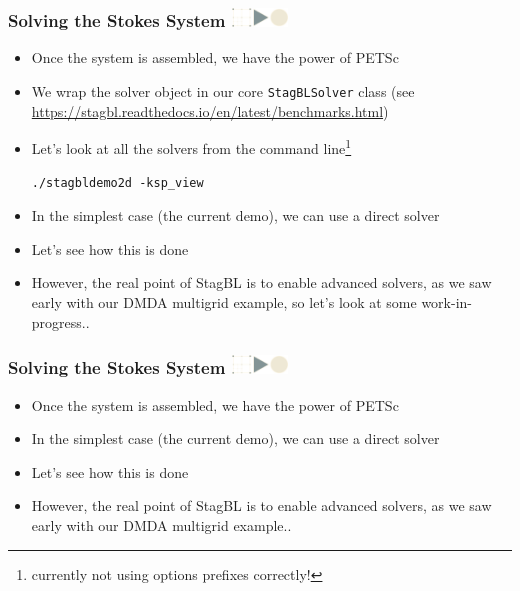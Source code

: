 \documentclass{beamer}
\newcommand\frametitlelogo[1]{\frametitle{#1\hspace{0pt plus 1 filll} \includegraphics[width=42pt]{logo_slides}}}
\begin{document}
\begin{frame}[fragile]
\frametitlelogo{Solving the Stokes System}
\begin{itemize}
\item Once the system is assembled, we have the power of PETSc
\item We wrap the solver object in our core \lstinline{StagBLSolver} class (see
\href{stagbl.readthedocs.io}{https://stagbl.readthedocs.io/en/latest/benchmarks.html})
\item Let's look at all the solvers from the command line\footnote{currently not using options prefixes correctly!}
  \begin{lstlisting}
./stagbldemo2d -ksp_view
  \end{lstlisting}
\item In the simplest case (the current demo), we can use a direct solver
\item Let's see how this is done
\item However, the real point of StagBL is to enable advanced solvers, as we saw early with our DMDA multigrid example, so let's look at some work-in-progress..
\end{itemize}
\end{frame}
\begin{frame}[fragile]
\frametitlelogo{Solving the Stokes System}
\begin{itemize}
\item Once the system is assembled, we have the power of PETSc
\item In the simplest case (the current demo), we can use a direct solver
\item Let's see how this is done
\item However, the real point of StagBL is to enable advanced solvers, as we saw early with our DMDA multigrid example..
\end{itemize}
\end{frame}
\end{document}
